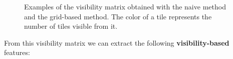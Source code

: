 \begin{figure}[hbt!]
    \centering
    \qquad
    \caption[Visibility comparison]{Examples of the visibility matrix obtained with the naive method and the grid-based method. The color of a tile represents the number of tiles visible from it.}
    \label{fig:visibility_example}
\end{figure}

From this visibility matrix we can extract the following \textbf{visibility-based} features:

